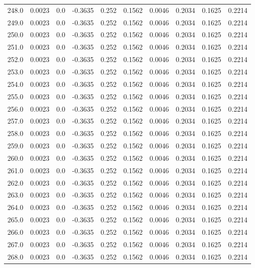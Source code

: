 \begin{longtable}{lrrrrrrrrr}
248.0 & 0.0023 & 0.0 & -0.3635 & 0.252 & 0.1562 & 0.0046 & 0.2034 & 0.1625 & 0.2214 \\
249.0 & 0.0023 & 0.0 & -0.3635 & 0.252 & 0.1562 & 0.0046 & 0.2034 & 0.1625 & 0.2214 \\
250.0 & 0.0023 & 0.0 & -0.3635 & 0.252 & 0.1562 & 0.0046 & 0.2034 & 0.1625 & 0.2214 \\
251.0 & 0.0023 & 0.0 & -0.3635 & 0.252 & 0.1562 & 0.0046 & 0.2034 & 0.1625 & 0.2214 \\
252.0 & 0.0023 & 0.0 & -0.3635 & 0.252 & 0.1562 & 0.0046 & 0.2034 & 0.1625 & 0.2214 \\
253.0 & 0.0023 & 0.0 & -0.3635 & 0.252 & 0.1562 & 0.0046 & 0.2034 & 0.1625 & 0.2214 \\
254.0 & 0.0023 & 0.0 & -0.3635 & 0.252 & 0.1562 & 0.0046 & 0.2034 & 0.1625 & 0.2214 \\
255.0 & 0.0023 & 0.0 & -0.3635 & 0.252 & 0.1562 & 0.0046 & 0.2034 & 0.1625 & 0.2214 \\
256.0 & 0.0023 & 0.0 & -0.3635 & 0.252 & 0.1562 & 0.0046 & 0.2034 & 0.1625 & 0.2214 \\
257.0 & 0.0023 & 0.0 & -0.3635 & 0.252 & 0.1562 & 0.0046 & 0.2034 & 0.1625 & 0.2214 \\
258.0 & 0.0023 & 0.0 & -0.3635 & 0.252 & 0.1562 & 0.0046 & 0.2034 & 0.1625 & 0.2214 \\
259.0 & 0.0023 & 0.0 & -0.3635 & 0.252 & 0.1562 & 0.0046 & 0.2034 & 0.1625 & 0.2214 \\
260.0 & 0.0023 & 0.0 & -0.3635 & 0.252 & 0.1562 & 0.0046 & 0.2034 & 0.1625 & 0.2214 \\
261.0 & 0.0023 & 0.0 & -0.3635 & 0.252 & 0.1562 & 0.0046 & 0.2034 & 0.1625 & 0.2214 \\
262.0 & 0.0023 & 0.0 & -0.3635 & 0.252 & 0.1562 & 0.0046 & 0.2034 & 0.1625 & 0.2214 \\
263.0 & 0.0023 & 0.0 & -0.3635 & 0.252 & 0.1562 & 0.0046 & 0.2034 & 0.1625 & 0.2214 \\
264.0 & 0.0023 & 0.0 & -0.3635 & 0.252 & 0.1562 & 0.0046 & 0.2034 & 0.1625 & 0.2214 \\
265.0 & 0.0023 & 0.0 & -0.3635 & 0.252 & 0.1562 & 0.0046 & 0.2034 & 0.1625 & 0.2214 \\
266.0 & 0.0023 & 0.0 & -0.3635 & 0.252 & 0.1562 & 0.0046 & 0.2034 & 0.1625 & 0.2214 \\
267.0 & 0.0023 & 0.0 & -0.3635 & 0.252 & 0.1562 & 0.0046 & 0.2034 & 0.1625 & 0.2214 \\
268.0 & 0.0023 & 0.0 & -0.3635 & 0.252 & 0.1562 & 0.0046 & 0.2034 & 0.1625 & 0.2214 \\

\end{longtable}
